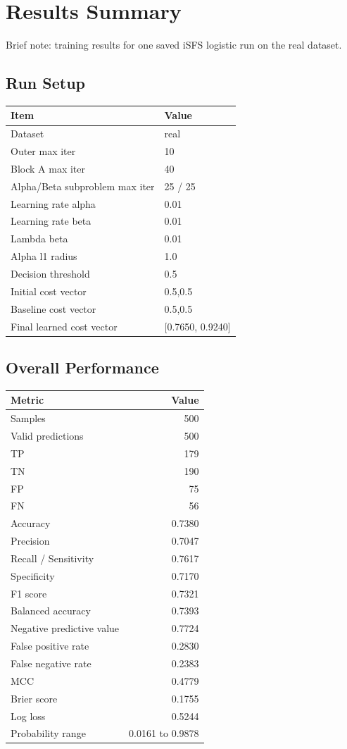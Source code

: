 \documentclass[11pt]{article}
\begin{document}
\section*{Results Summary}

Brief note: training results for one saved iSFS logistic run on the real dataset.

\subsection*{Run Setup}
\begin{tabular}{ll}
\toprule
Item & Value \\
\midrule
Dataset & real \\
Outer max iter & 10 \\
Block A max iter & 40 \\
Alpha/Beta subproblem max iter & 25 / 25 \\
Learning rate alpha & 0.01 \\
Learning rate beta & 0.01 \\
Lambda beta & 0.01 \\
Alpha l1 radius & 1.0 \\
Decision threshold & 0.5 \\
Initial cost vector & 0.5,0.5 \\
Baseline cost vector & 0.5,0.5 \\
Final learned cost vector & [0.7650, 0.9240] \\
\bottomrule
\end{tabular}

\subsection*{Overall Performance}
\begin{tabular}{lr}
\toprule
Metric & Value \\
\midrule
Samples & 500 \\
Valid predictions & 500 \\
TP & 179 \\
TN & 190 \\
FP & 75 \\
FN & 56 \\
Accuracy & 0.7380 \\
Precision & 0.7047 \\
Recall / Sensitivity & 0.7617 \\
Specificity & 0.7170 \\
F1 score & 0.7321 \\
Balanced accuracy & 0.7393 \\
Negative predictive value & 0.7724 \\
False positive rate & 0.2830 \\
False negative rate & 0.2383 \\
MCC & 0.4779 \\
Brier score & 0.1755 \\
Log loss & 0.5244 \\
Probability range & 0.0161 to 0.9878 \\
\bottomrule
\end{tabular}
\end{document}
